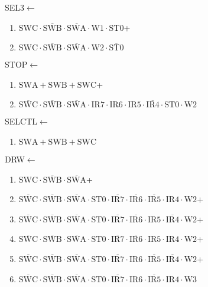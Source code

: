 \documentclass[UTF8]{ctexart}
\begin{document}
SEL3$\leftarrow$
\begin{enumerate}[\indent\indent]
	\item$\text{SWC}\cdot\overline{\text{SWB}}\cdot\overline{\text{SWA}}\cdot\text{W1}\cdot\text{ST0}$+
	\item$\text{SWC}\cdot\overline{\text{SWB}}\cdot\overline{\text{SWA}}\cdot\text{W2}\cdot\overline{\text{ST0}}$
\end{enumerate}		
STOP$\leftarrow$
\begin{enumerate}[\indent\indent]
	\item$\text{SWA}+\text{SWB}+\text{SWC}$+
	\item$\overline{\text{SWC}}\cdot\overline{\text{SWB}}\cdot\overline{\text{SWA}}\cdot {\text{IR7}} \cdot {\text{IR6}}\cdot {\text{IR5}}\cdot \overline{\text{IR4}} \cdot \text{ST0}\cdot \text{W2}$
\end{enumerate}
SELCTL$\leftarrow$
\begin{enumerate}[\indent\indent]
	\item$\text{SWA}+\text{SWB}+\text{SWC}$
\end{enumerate}
DRW$\leftarrow$
\begin{enumerate}[\indent\indent]
	\item$\text{SWC}\cdot\overline{\text{SWB}}\cdot\overline{\text{SWA}}$+
	\item$\overline{\text{SWC}}\cdot\overline{\text{SWB}}\cdot\overline{\text{SWA}}\cdot\text{ST0}\cdot\overline{\text{IR7}}\cdot\overline{\text{IR6}}\cdot\overline{\text{IR5}}\cdot\text{IR4}\cdot\text{W2}$+
	\item$\overline{\text{SWC}}\cdot\overline{\text{SWB}}\cdot\overline{\text{SWA}}\cdot\text{ST0}\cdot\overline{\text{IR7}}\cdot\overline{\text{IR6}}\cdot{\text{IR5}}\cdot\overline{\text{IR4}}\cdot\text{W2}$+
	\item$\overline{\text{SWC}}\cdot\overline{\text{SWB}}\cdot\overline{\text{SWA}}\cdot\text{ST0}\cdot\overline{\text{IR7}}\cdot\overline{\text{IR6}}\cdot\text{IR5}\cdot\text{IR4}\cdot\text{W2}$+
	\item$\overline{\text{SWC}}\cdot\overline{\text{SWB}}\cdot\overline{\text{SWA}}\cdot\text{ST0}\cdot\overline{\text{IR7}}\cdot{\text{IR6}}\cdot\overline{\text{IR5}}\cdot\overline{\text{IR4}}\cdot\text{W2}$+
	\item$\overline{\text{SWC}}\cdot\overline{\text{SWB}}\cdot\overline{\text{SWA}}\cdot\text{ST0}\cdot\overline{\text{IR7}}\cdot{\text{IR6}}\cdot\overline{\text{IR5}}\cdot{\text{IR4}}\cdot\text{W3}$
\end{enumerate}
\end{document}
